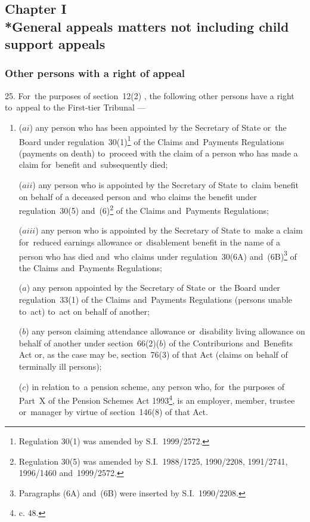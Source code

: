\documentclass[12pt,a4paper]{article}
\begin{document}
\subsection[Chapter I --- General appeals matters not including child support appeals]{Chapter I\\*General appeals matters not including child support appeals}

\renewcommand\parthead{--- Part~IV Chapter I}

\subsubsection[25. Other persons with a right of appeal]{Other persons with a right of appeal}

25.  For~the purposes of 
section~12(2)%
, the following other persons have a right to~appeal to 
the First-tier Tribunal%
—
\begin{enumerate}\item[]
($ai$) any person who has been appointed by the Secretary of State or~the Board under regulation~30(1)\footnote{Regulation 30(1) was amended by S.I.~1999/2572.} of the Claims and~Payments Regulations (payments on death) to~proceed with the claim of a person who has made a claim for~benefit and~subsequently died;

($aii$) any person who is appointed by the Secretary of State to~claim benefit on behalf of a deceased person and~who claims the benefit under regulation~30(5) and~(6)\footnote{Regulation 30(5) was amended by S.I.~1988/1725, 1990/2208, 1991/2741, 1996/1460 and~1999/2572.} of the Claims and~Payments Regulations;

($aiii$) any person who is appointed by the Secretary of State to~make a claim for~reduced earnings allowance or~disablement benefit in the name of a person who has died and~who claims under regulation~30(6A) and~(6B)\footnote{Paragraphs (6A) and~(6B) were inserted by S.I.~1990/2208.} of the Claims and~Payments Regulations;

($a$) any person appointed by the Secretary of State 
or~the Board  %
under regulation~33(1) of the Claims and~Payments Regulations (persons unable to~act) to~act on behalf of another;

($b$) any person claiming attendance allowance or~disability living allowance on behalf of another under section~66(2)($b$) of the Contriburions and~Benefits Act or, as the case may be, section~76(3) of that Act (claims on behalf of terminally ill persons);

($c$) in relation to~a pension scheme, any person who, for~the purposes of Part~X of the Pension Schemes Act 1993\footnote{ c. 48.}, is an employer, member, trustee or~manager by virtue of section~146(8) of that Act.
\end{enumerate}
\end{document}
